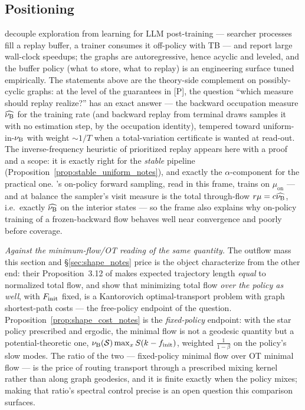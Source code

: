 \documentclass[11pt]{article}
\theoremstyle{definition}
\theoremstyle{remark}
\def\lambda{\widehat\nuB}
\begin{document}
\subsection{Positioning}\label{sec:positioning_notes}

\citet{bartoldson2025trajectory} decouple exploration from learning for LLM post-training
--- searcher processes fill a replay buffer, a trainer consumes it off-policy with TB ---
and report large wall-clock speedups; the graphs are autoregressive, hence acyclic and
leveled, and the buffer policy (what to store, what to replay) is an engineering
surface tuned empirically. The statements above are the theory-side complement on
possibly-cyclic graphs: at the level of the guarantees in [P], the question ``which
measure should replay realize?'' has an exact answer --- the backward occupation measure
$\lambda$ for the training rate (and backward replay from terminal draws samples it with
no estimation step, by the occupation identity), tempered toward uniform-in-$\nu_{\mathrm{B}}$
with weight $\sim1/T$ when a total-variation certificate is wanted at read-out. The
inverse-frequency heuristic of prioritized replay appears here with a proof and a scope:
it is exactly right for the \emph{stable} pipeline (Proposition~\ref{prop:stable_uniform_notes}),
and exactly the $\alpha$-component for the practical one. \citet{morozov2025revisiting}'s
on-policy forward sampling, read in this frame, trains on $\mu_{\mathrm{on}}$ --- and at
balance the sampler's visit measure is the total through-flow $r\mu=c\lambda$, i.e.\
exactly $\lambda$ on the interior states --- so the frame also explains why on-policy
training of a frozen-backward flow behaves well near convergence and poorly before
coverage.

\emph{Against the minimum-flow/OT reading of the same quantity.} The outflow mass this
section and \S\ref{sec:shape_notes} price is the object \citet{maksimov2026ot} characterize
from the other end: their Proposition~3.12 of \citet{morozov2025revisiting} makes
expected trajectory length \emph{equal} to normalized total flow, and
\citet{maksimov2026ot} show that minimizing total flow \emph{over the policy as well},
with $F_{\mathrm{init}}$ fixed, is a Kantorovich optimal-transport problem with graph shortest-path
costs --- the free-policy endpoint of the question. Proposition~\ref{prop:shape_cost_notes} is
the \emph{fixed-policy} endpoint: with the star policy prescribed and ergodic, the
minimal flow is not a geodesic quantity but a potential-theoretic one,
$\nu_{\mathrm{B}}(\mathcal S)\max_xS(k-f_{\mathrm{init}})$, weighted $\frac1{1-\beta}$ on the policy's slow
modes. The ratio of the two --- fixed-policy minimal flow over OT minimal flow --- is
the price of routing transport through a prescribed mixing kernel rather than along
graph geodesics, and it is finite exactly when the policy mixes; making that ratio's
spectral control precise is an open question this comparison surfaces.
\end{document}
